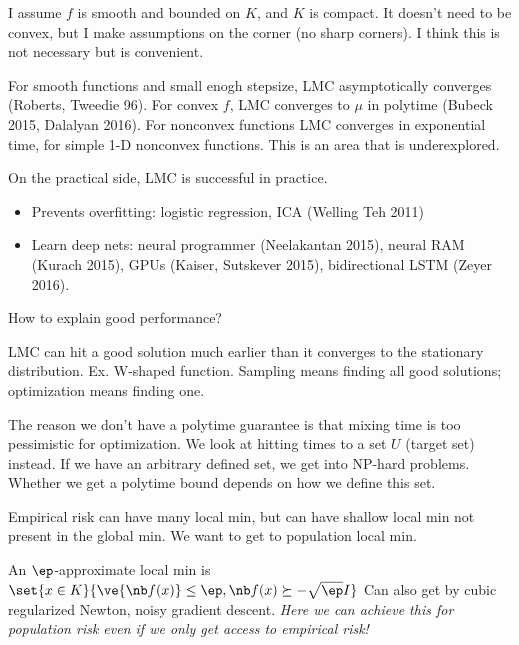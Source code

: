 I assume $f$ is smooth and bounded on $K$, and $K$ is compact. It doesn't need to be convex, but I make assumptions on the corner (no sharp corners). I think this is not necessary but is convenient.

For smooth functions and small enogh stepsize, LMC asymptotically converges (Roberts, Tweedie 96). 
For convex $f$, LMC converges to $\mu$ in polytime (Bubeck 2015, Dalalyan 2016).
For nonconvex functions LMC converges in exponential time, for simple 1-D nonconvex functions.
This is an area that is underexplored.

On the practical side, LMC is successful in practice.
\begin{itemize}
\item
Prevents overfitting: logistic regression, ICA (Welling Teh 2011)
\item
Learn deep nets:  neural programmer (Neelakantan 2015), neural RAM (Kurach 2015), GPUs (Kaiser, Sutskever 2015), bidirectional LSTM (Zeyer 2016).
\end{itemize}
How to explain good performance?


LMC can hit a good solution much earlier than it converges to the stationary distribution. Ex. W-shaped function. Sampling means finding all good solutions; optimization means finding one.


The reason we don't have a polytime guarantee is that mixing time is too pessimistic for optimization. We look at hitting times  to a set $U$ (target set) instead. If we have an arbitrary defined set, we get into NP-hard problems. Whether we get a polytime bound depends on how we define this set.


Empirical risk can have many local min, but can have shallow local min not present in the global min. We want to get to population local min.

An $\ep$-approximate local min is $\set{x\in K}{\ve{\nb f(x)}\le \ep, \nb f(x) \succeq -\sqrt{\ep}I}$
Can also get by cubic regularized Newton, noisy gradient descent. \emph{Here we can achieve this for population risk even if we only get access to empirical risk!}

